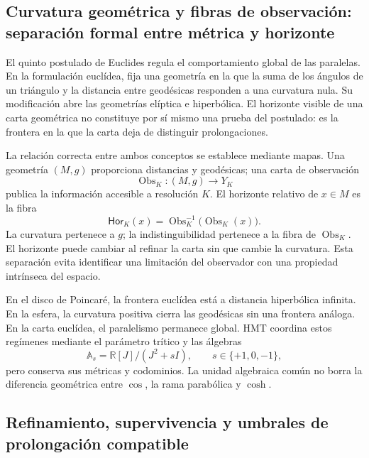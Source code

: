 \subsection{Curvatura geométrica y fibras de observación: separación formal entre métrica y horizonte}

El quinto postulado de Euclides regula el comportamiento global de las
paralelas. En la formulación euclídea, fija una geometría en la que la suma de
los ángulos de un triángulo y la distancia entre geodésicas responden a una
curvatura nula. Su modificación abre las geometrías elíptica e hiperbólica.
El horizonte visible de una carta geométrica no constituye por sí mismo una
prueba del postulado: es la frontera en la que la carta deja de distinguir
prolongaciones.

La relación correcta entre ambos conceptos se establece mediante mapas. Una
geometría \((M,g)\) proporciona distancias y geodésicas; una carta de
observación
\begin{equation}\label{p12-83-c0-s2:eq:amp-carta-horizonte}
 \operatorname{Obs}_{K}:(M,g)\longrightarrow Y_K
\end{equation}
publica la información accesible a resolución \(K\). El horizonte relativo
de \(x\in M\) es la fibra
\begin{equation}\label{p12-83-c0-s2:eq:amp-fibra-horizonte}
 \mathsf{Hor}_K(x)=\operatorname{Obs}_K^{-1}
 \bigl(\operatorname{Obs}_K(x)\bigr).
\end{equation}
La curvatura pertenece a \(g\); la indistinguibilidad pertenece a la fibra
de \(\operatorname{Obs}_K\). El horizonte puede cambiar al refinar la carta
sin que cambie la curvatura. Esta separación evita identificar una
limitación del observador con una propiedad intrínseca del espacio.

En el disco de Poincaré, la frontera euclídea está a distancia hiperbólica
infinita. En la esfera, la curvatura positiva cierra las geodésicas sin una
frontera análoga. En la carta euclídea, el paralelismo permanece global. HMT
coordina estos regímenes mediante el parámetro trítico y las álgebras
\begin{equation}\label{p12-83-c0-s2:eq:amp-tres-regimenes}
 \mathbb A_s=\mathbb R[J]/(J^2+sI),
 \qquad s\in\{+1,0,-1\},
\end{equation}
pero conserva sus métricas y codominios. La unidad algebraica común no borra
la diferencia geométrica entre \(\cos\), la rama parabólica y \(\cosh\).

\subsection{Refinamiento, supervivencia y umbrales de prolongación compatible}

